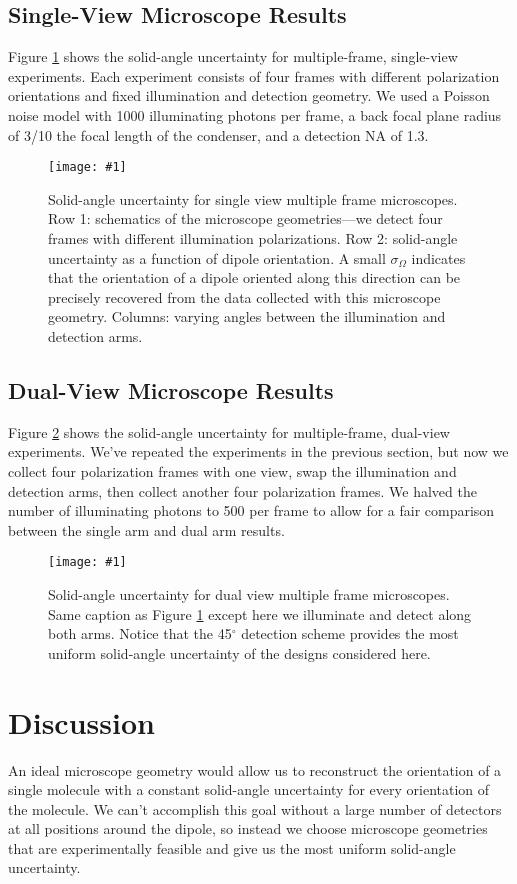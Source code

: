 \documentclass[11pt]{article}
\providecommand{\fig}[4]{
\begin{figure}[h]
 \captionsetup{width=1.0\linewidth}
 \centering
 \texttt{[image: \#1]}
 \caption{#3}
 \label{fig:#4}
\end{figure}
}
\begin{document}
\subsection{Single-View Microscope Results}
Figure \ref{fig:one_arm} shows the solid-angle uncertainty for multiple-frame,
single-view experiments. Each experiment consists of four frames with different
polarization orientations and fixed illumination and detection geometry. We used
a Poisson noise model with 1000 illuminating photons per frame, a back focal
plane radius of 3/10 the focal length of the condenser, and a detection NA of
1.3.
  
\fig{../figures/singlearm3.png}{0.9}{Solid-angle uncertainty for single view multiple frame
  microscopes. Row 1: schematics of the microscope geometries---we detect four
  frames with different illumination polarizations. Row 2: solid-angle
  uncertainty as a function of dipole orientation. A small $\sigma_{\Omega}$
  indicates that the orientation of a dipole oriented along this direction can
  be precisely recovered from the data collected with this microscope
  geometry. Columns: varying angles between the illumination and detection
  arms. }{one_arm}

\subsection{Dual-View Microscope Results}

Figure \ref{fig:dual_arm} shows the solid-angle uncertainty for multiple-frame,
dual-view experiments. We've repeated the experiments in the previous section,
but now we collect four polarization frames with one view, swap the illumination
and detection arms, then collect another four polarization frames. We halved the
number of illuminating photons to 500 per frame to allow for a fair comparison
between the single arm and dual arm results.

\fig{../figures/dualarm3.png}{0.9}{Solid-angle uncertainty for dual view multiple frame
  microscopes. Same caption as Figure \ref{fig:one_arm} except here we
  illuminate and detect along both arms. Notice that the 45${}^{\circ}$
  detection scheme provides the most uniform solid-angle uncertainty of the
  designs considered here.}{dual_arm}

\section{Discussion}
An ideal microscope geometry would allow us to reconstruct the orientation of a
single molecule with a constant solid-angle uncertainty for every orientation of
the molecule. We can't accomplish this goal without a large number of detectors
at all positions around the dipole, so instead we choose microscope geometries
that are experimentally feasible and give us the most uniform solid-angle
uncertainty.
\end{document}
